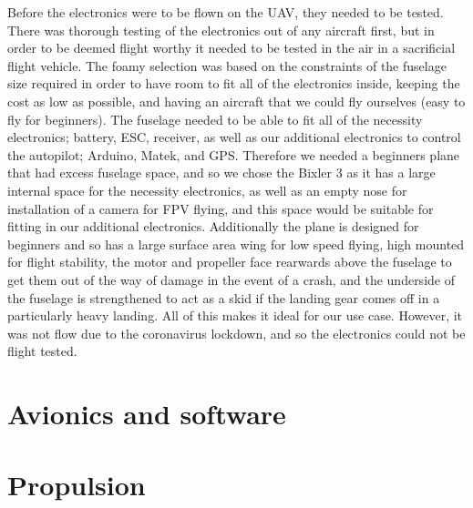 \documentclass[../../main.tex]{subfiles}
\begin{document}
Before the electronics were to be flown on the UAV, they needed to be tested.
There was thorough testing of the electronics out of any aircraft first, but in order to be deemed flight worthy it needed to be tested in the air in a sacrificial flight vehicle.
The foamy selection was based on the constraints of the fuselage size required in order to have room to fit all of the electronics inside, keeping the cost as low as possible, and having an aircraft that we could fly ourselves (easy to fly for beginners).
The fuselage needed to be able to fit all of the necessity electronics; battery, ESC, receiver, as well as our additional electronics to control the autopilot; Arduino, Matek, and GPS.
Therefore we needed a beginners plane that had excess fuselage space, and so we chose the Bixler 3 as it has a large internal space for the necessity electronics, as well as an empty nose for installation of a camera for FPV flying, and this space would be suitable for fitting in our additional electronics.
Additionally the plane is designed for beginners and so has a large surface area wing for low speed flying, high mounted for flight stability, the motor and propeller face rearwards above the fuselage to get them out of the way of damage in the event of a crash, and the underside of the fuselage is strengthened to act as a skid if the landing gear comes off in a particularly heavy landing.
All of this makes it ideal for our use case.
However, it was not flow due to the coronavirus lockdown, and so the electronics could not be flight tested. 

\section{Avionics and software} \label{sec:final-design-proposal:avionics-and-software}


\section{Propulsion} \label{sec:final-design-proposal:propulsion}

\end{document}
